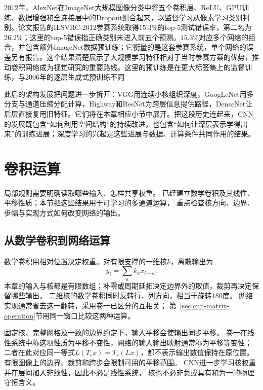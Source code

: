 2012年，AlexNet在ImageNet大规模图像分类中将五个卷积层、ReLU、GPU训练、数据增强和全连接层中的Dropout组合起来，以监督学习从像素学习类别判别。论文报告的ILSVRC-2012参赛系统取得$15.3\%$的top-5测试错误率，第二名为$26.2\%$；这里的top-5错误指正确类别未进入前五个预测。$15.3\%$对应多个网络的组合，并包含额外ImageNet数据预训练；它衡量的是这套参赛系统，单个网络的误差另有报告。这个结果清楚展示了大规模学习特征相对于当时参赛方案的优势，推动卷积网络成为视觉研究的重要路线。这里的预训练是在更大标签集上的监督训练，与2006年的逐层生成式预训练不同

此后的架构发展把问题进一步拆开：VGG用连续小核组织深度，GoogLeNet用多分支与通道压缩分配计算，Highway和ResNet为跨层信息提供路径，DenseNet让后层直接复用旧特征。它们将在本章相应小节中展开。把这段历史连起来，CNN的发展既包含“如何利用空间结构”的持续改进，也包含“如何让深层表示学得出来”的训练进展；深度学习的兴起是这些进展与数据、计算条件共同作用的结果。

\section{卷积运算}
\label{sec:cnn-convolution}

局部规则需要明确读取哪些输入、怎样共享权重。
已经建立数学卷积及其线性、平移性质；本节把这些结果用于可学习的多通道运算，
重点检查核方向、边界、步幅与实现方式如何改变网络的输出。

\subsection{从数学卷积到网络运算}
\label{sec:cnn-convolution-definition}

数学卷积用相对位置决定权重。对有限支撑的一维核$k$，离散输出为
\[
  y_i=\sum_a k_a x_{i-a}.
\]
本章的输入与核都是有限数组；补零或周期延拓决定边界外的取值，裁剪再决定保留哪些输出。
二维核的数学卷积同时反转行、列方向，相当于旋转$180$度。
网络实现通常省去这一翻转，采用卷一已区分的互相关；
第~\ref{sec:cnn-matrix-operation}节用同一窗口比较这两种运算。

固定核、完整网格及一致的边界约定下，输入平移会使输出同步平移。
卷一在线性系统中称这项性质为平移不变性，网络的输入输出映射通常称为平移等变性；
二者在此对应同一等式$L(T_rx)=T_r(Lx)$，都不表示输出数值保持在原位置。
有限图像上的边界、裁剪和跨步会限制可用的平移范围。
CNN进一步学习核权重并在层间加入非线性，因此不必是线性系统，
核也不必非负或具有和为一的物理守恒含义。

